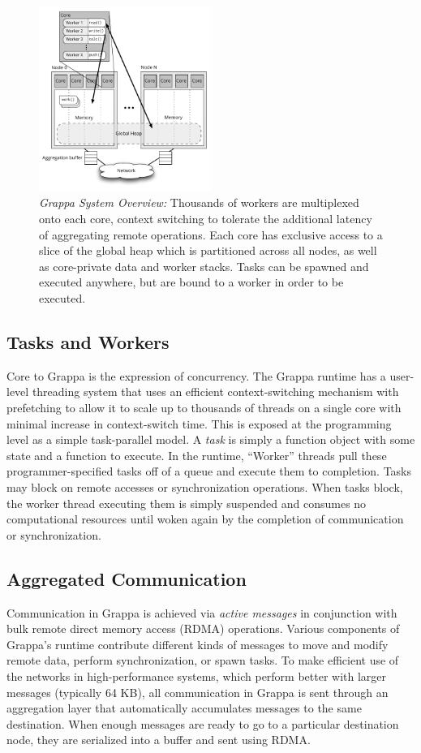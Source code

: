 \begin{figure}[t]
  \centering
  \includegraphics[width=0.5\textwidth]{figs/grappa_system.pdf}
  \caption{\emph{Grappa System Overview:}
    Thousands of workers are multiplexed onto each core, context switching to tolerate the additional latency of aggregating remote operations. Each core has exclusive access to a slice of the global heap which is partitioned across all nodes, as well as core-private data and worker stacks. Tasks can be spawned and executed anywhere, but are bound to a worker in order to be executed.
  }
  \label{fig:system}
\end{figure}

\subsection{Tasks and Workers}
Core to Grappa is the expression of concurrency. The Grappa runtime has a user-level threading system that uses an efficient context-switching mechanism with prefetching to allow it to scale up to thousands of threads on a single core with minimal increase in context-switch time. This is exposed at the programming level as a simple task-parallel model. A \emph{task} is simply a function object with some state and a function to execute. In the runtime, ``Worker'' threads pull these programmer-specified tasks off of a queue and execute them to completion. Tasks may block on remote accesses or synchronization operations. When tasks block, the worker thread executing them is simply suspended and consumes no computational resources until woken again by the completion of communication or synchronization.

\subsection{Aggregated Communication}
Communication in Grappa is achieved via \emph{active messages} in conjunction with bulk remote direct memory access (RDMA) operations. Various components of Grappa's runtime contribute different kinds of messages to move and modify remote data, perform synchronization, or spawn tasks. To make efficient use of the networks in high-performance systems, which perform better with larger messages (typically 64 KB), all communication in Grappa is sent through an aggregation layer that automatically accumulates messages to the same destination. When enough messages are ready to go to a particular destination node, they are serialized into a buffer and sent using RDMA.

